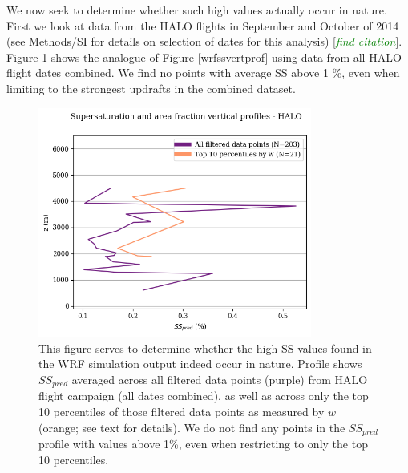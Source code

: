 \documentclass{article}
\newcommand{\todo}[1]{\textcolor{green}{\textit{#1}}}
\begin{document}
\clearpage
\newpage

We now seek to determine whether such high values actually occur in nature. First we look at data from the HALO flights in September and October of 2014 (see Methods/SI for details on selection of dates for this analysis) [\todo{find citation}]. Figure \ref{halossvertprof} shows the analogue of Figure \ref{wrfssvertprof} using data from all HALO flight dates combined. We find no points with average SS above 1 \%, even when limiting to the strongest updrafts in the combined dataset.

\begin{figure}[ht]
    \centering
    \includegraphics[width=9cm]{halo/ss_pred_vs_z_figure.png}
    \caption{This figure serves to determine whether the high-SS values found in the WRF simulation output indeed occur in nature. Profile shows $SS_{pred}$ averaged across all filtered data points (purple) from HALO flight campaign (all dates combined), as well as across only the top 10 percentiles of those filtered data points as measured by $w$ (orange; see text for details). We do not find any points in the $SS_{pred}$ profile with values above 1\%, even when restricting to only the top 10 percentiles.}
    \label{halossvertprof}
\end{figure}
\end{document}
